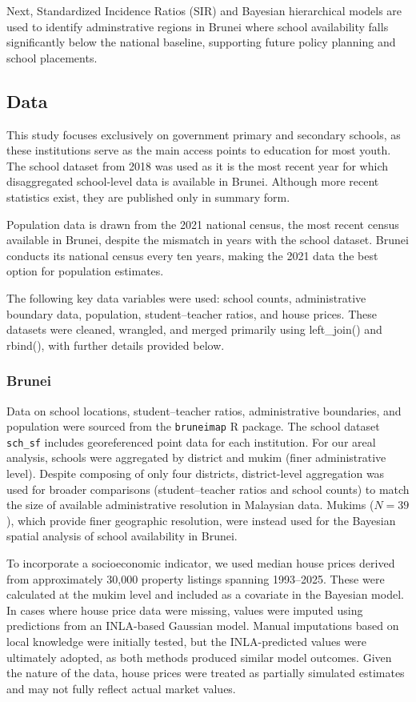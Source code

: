 \documentclass[
  12pt,
]{article}
\begin{document}
Next, Standardized Incidence Ratios (SIR) and Bayesian hierarchical
models are used to identify adminstrative regions in Brunei where school
availability falls significantly below the national baseline, supporting
future policy planning and school placements.

\subsection{Data}\label{data}

This study focuses exclusively on government primary and secondary
schools, as these institutions serve as the main access points to
education for most youth. The school dataset from 2018 was used as it is
the most recent year for which disaggregated school-level data is
available in Brunei. Although more recent statistics exist, they are
published only in summary form.

Population data is drawn from the 2021 national census, the most recent
census available in Brunei, despite the mismatch in years with the
school dataset. Brunei conducts its national census every ten years,
making the 2021 data the best option for population estimates.

The following key data variables were used: school counts,
administrative boundary data, population, student--teacher ratios, and
house prices. These datasets were cleaned, wrangled, and merged
primarily using left\_join() and rbind(), with further details provided
below.

\subsubsection{Brunei}\label{brunei}

Data on school locations, student--teacher ratios, administrative
boundaries, and population were sourced from the \texttt{bruneimap} R
package. The school dataset \texttt{sch\_sf} includes georeferenced
point data for each institution. For our areal analysis, schools were
aggregated by district and mukim (finer administrative level). Despite
composing of only four districts, district-level aggregation was used
for broader comparisons (student--teacher ratios and school counts) to
match the size of available administrative resolution in Malaysian data.
Mukims (\(N = 39\)), which provide finer geographic resolution, were
instead used for the Bayesian spatial analysis of school availability in
Brunei.

To incorporate a socioeconomic indicator, we used median house prices
derived from approximately 30,000 property listings spanning 1993--2025.
These were calculated at the mukim level and included as a covariate in
the Bayesian model. In cases where house price data were missing, values
were imputed using predictions from an INLA-based Gaussian model. Manual
imputations based on local knowledge were initially tested, but the
INLA-predicted values were ultimately adopted, as both methods produced
similar model outcomes. Given the nature of the data, house prices were
treated as partially simulated estimates and may not fully reflect
actual market values.
\end{document}
